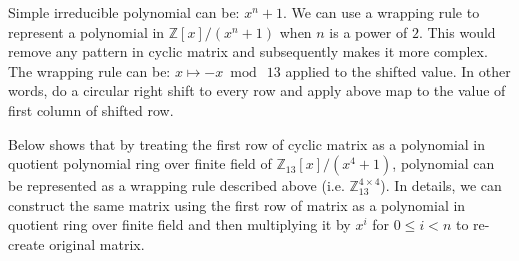 
Simple irreducible polynomial can be: $x^n + 1$. We can use a wrapping rule to represent a polynomial in $\mathbb{Z}[x] / (x^n + 1)$ when $n$ is a power of $2$. This would remove any pattern in cyclic matrix and subsequently makes it more complex. The wrapping rule can be: ${x \mapsto -x \bmod \ 13}$ applied to the shifted value. In other words, do a circular right shift to every row and apply above map to the value of first column of shifted row.


Below shows that by treating the first row of cyclic matrix as a polynomial in quotient polynomial ring over finite field of $\mathbb{Z}_{13}[x] / ( x^{4} + 1 )$, polynomial can be represented as a wrapping rule described above (i.e. $\mathbb{Z}^{4 \times 4}_{13}$). In details, we can construct the same matrix using the first row of matrix as a polynomial in quotient ring over finite field and then multiplying it by $x^i$ for $0 \le i < n$ to re-create original matrix.


